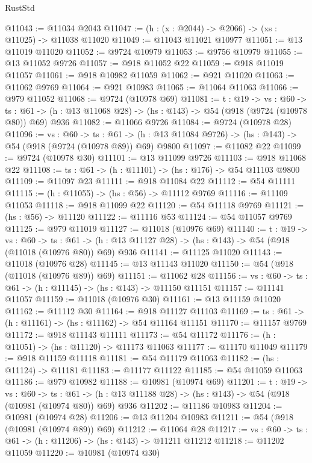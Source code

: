 \begin{lexlean}{RustStd}
\begin{coremodule}
@11043 := @11034 @2043
@11047 := (h : (x : @2044) -> @2066) -> (xs : @11025) -> @11038 @11020
@11049 := @11043 @11021 @10977
@11051 := @13 @11019 @11020
@11052 := @9724 @10979
@11053 := @9756 @10979
@11055 := @13 @11052 @9726
@11057 := @918 @11052 @22
@11059 := @918 @11019 @11057
@11061 := @918 @10982 @11059
@11062 := @921 @11020
@11063 := @11062 @9769
@11064 := @921 @10983
@11065 := @11064 @11063
@11066 := @979 @11052
@11068 := @9724 (@10978 @69)
@11081 := {t : @19} ->
  {vs : @60} ->
  {ts : @61} -> (h : @13 @11068 @28) -> (hs : @143) -> @54 (@918 (@9724 (@10978 @80)) @69) @936
@11082 := @11066 @9726
@11084 := @9724 (@10978 @28)
@11096 := {vs : @60} ->
  {ts : @61} -> (h : @13 @11084 @9726) -> (hs : @143) -> @54 (@918 (@9724 (@10978 @89)) @69) @9800
@11097 := @11082 @22
@11099 := @9724 (@10978 @30)
@11101 := @13 @11099 @9726
@11103 := @918 @11068 @22
@11108 := {ts : @61} -> (h : @11101) -> (hs : @176) -> @54 @11103 @9800
@11109 := @11097 @23
@11111 := @918 @11084 @22
@11112 := @54 @11111
@11115 := (h : @11055) -> (hs : @56) -> @11112 @9769
@11116 := @11109 @11053
@11118 := @918 @11099 @22
@11120 := @54 @11118 @9769
@11121 := (hs : @56) -> @11120
@11122 := @11116 @53
@11124 := @54 @11057 @9769
@11125 := @979 @11019
@11127 := @11018 (@10976 @69)
@11140 := {t : @19} ->
  {vs : @60} ->
  {ts : @61} -> (h : @13 @11127 @28) -> (hs : @143) -> @54 (@918 (@11018 (@10976 @80)) @69) @936
@11141 := @11125 @11020
@11143 := @11018 (@10976 @28)
@11145 := @13 @11143 @11020
@11150 := @54 (@918 (@11018 (@10976 @89)) @69)
@11151 := @11062 @28
@11156 := {vs : @60} -> {ts : @61} -> (h : @11145) -> (hs : @143) -> @11150 @11151
@11157 := @11141 @11057
@11159 := @11018 (@10976 @30)
@11161 := @13 @11159 @11020
@11162 := @11112 @30
@11164 := @918 @11127 @11103
@11169 := {ts : @61} -> (h : @11161) -> (hs : @11162) -> @54 @11164 @11151
@11170 := @11157 @9769
@11172 := @918 @11143 @11111
@11173 := @54 @11172
@11176 := (h : @11051) -> (hs : @11120) -> @11173 @11063
@11177 := @11170 @11049
@11179 := @918 @11159 @11118
@11181 := @54 @11179 @11063
@11182 := (hs : @11124) -> @11181
@11183 := @11177 @11122
@11185 := @54 @11059 @11063
@11186 := @979 @10982
@11188 := @10981 (@10974 @69)
@11201 := {t : @19} ->
  {vs : @60} ->
  {ts : @61} -> (h : @13 @11188 @28) -> (hs : @143) -> @54 (@918 (@10981 (@10974 @80)) @69) @936
@11202 := @11186 @10983
@11204 := @10981 (@10974 @28)
@11206 := @13 @11204 @10983
@11211 := @54 (@918 (@10981 (@10974 @89)) @69)
@11212 := @11064 @28
@11217 := {vs : @60} -> {ts : @61} -> (h : @11206) -> (hs : @143) -> @11211 @11212
@11218 := @11202 @11059
@11220 := @10981 (@10974 @30)

\end{coremodule}
\end{lexlean}
